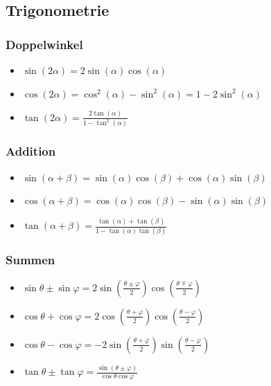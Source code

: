 \documentclass[a4paper,10pt]{article}
\begin{document}
\subsection{Trigonometrie}

\subsubsection{Doppelwinkel}
\begin{itemize}
 \item $\sin(2\alpha) = 2 \sin(\alpha) \cos(\alpha)$
 \item $\cos(2\alpha) = \cos^2(\alpha) - \sin^2(\alpha) = 1 - 2 \sin^2(\alpha)$
 \item $\tan(2\alpha) = \frac{2\tan(\alpha)}{1 - \tan^2(\alpha)}$
\end{itemize}

\subsubsection{Addition}
\begin{itemize}
 \item $\sin(\alpha + \beta) = \sin(\alpha) \cos(\beta) + \cos(\alpha) \sin(\beta)$
 \item $\cos(\alpha + \beta) = \cos(\alpha) \cos(\beta) - \sin(\alpha) \sin(\beta)$
 \item $\tan(\alpha + \beta) = \frac{\tan(\alpha) + \tan(\beta)}{1 - \tan(\alpha) \tan(\beta)}$
\end{itemize}

\subsubsection{Summen}
\begin{itemize}
  \item $\sin \theta \pm \sin \varphi = 2 \sin \left( \frac{\theta \pm \varphi}{2} \right) \cos \left( \frac{\theta \mp \varphi}{2} \right)$
  \item $\cos \theta + \cos \varphi = 2 \cos \left( \frac{\theta + \varphi}{2} \right) \cos \left( \frac{\theta - \varphi}{2} \right)$
  \item $\cos \theta - \cos \varphi = -2 \sin \left( \frac{\theta + \varphi}{2} \right) \sin \left( \frac{\theta - \varphi}{2} \right)$
  \item $\tan \theta \pm \tan \varphi = \frac{\sin(\theta \pm \varphi)}{\cos \theta \cos \varphi}$
  \end{itemize}
\end{document}
